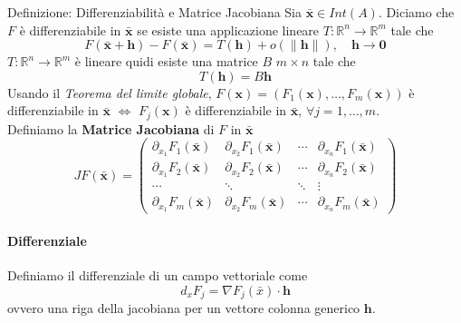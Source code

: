 \documentclass[x11names]{article}
\begin{document}
	\begin{center}
		\colorbox{myblue}{\begin{minipage}{5.75in}
				\begin{blues}{Definizione: Differenziabilità e Matrice Jacobiana}
					Sia \(\boldsymbol{\bar{x}} \in Int(A)\). Diciamo che \(F\) è differenziabile in \(\boldsymbol{\bar{x}}\) se esiste una applicazione lineare \(T:\mathbb{R}^n\to \mathbb{R}^m\) tale che
					\[ 
					F(\boldsymbol{\bar{x}} + \boldsymbol{h}) - F(\boldsymbol{\bar{x}}) = T(\boldsymbol{h}) + o(\|\boldsymbol{h}\|), \quad \boldsymbol{h} \to \boldsymbol{0}
					\]
					\(T:\mathbb{R}^n\to \mathbb{R}^m\) è lineare quidi esiste una matrice \(B\) \(m\times n\) tale che
					\[ 
					T(\boldsymbol{h}) = B\boldsymbol{h}
					\] 
					Usando il \textit{Teorema del limite globale}, \(F(\boldsymbol{x}) = (F_{1}(\boldsymbol{x}),\dots,F_{m}(\boldsymbol{x}))\) è differenziabile in \(\boldsymbol{\bar{x}}\) \(\Longleftrightarrow\) \(F_{j}(\boldsymbol{x})\) è differenziabile in \(\boldsymbol{\bar{x}}\), \(\forall j = 1,\dots,m\). \\
					
					Definiamo la \textbf{Matrice Jacobiana} di \(F\) in \(\boldsymbol{\bar{x}}\)
					\[ 
					JF(\boldsymbol{\bar{x}}) = 
					\left(\begin{array}{cccc}
						\partial_{x_{1}}F_{1}(\boldsymbol{\bar{x}}) & \partial_{x_{2}}F_{1}(\boldsymbol{\bar{x}}) & \cdots & \partial_{x_{n}}F_{1}(\boldsymbol{\bar{x}})  \\
						\partial_{x_{1}}F_{2}(\boldsymbol{\bar{x}}) & \partial_{x_{2}}F_{2}(\boldsymbol{\bar{x}}) & \cdots & \partial_{x_{n}}F_{2}(\boldsymbol{\bar{x}})  \\
						\cdots & \ddots & \ddots & \vdots \\
						\partial_{x_{1}}F_{m}(\boldsymbol{\bar{x}}) & \partial_{x_{2}}F_{m}(\boldsymbol{\bar{x}}) & \cdots & \partial_{x_{n}}F_{m}(\boldsymbol{\bar{x}})   
					\end{array}\right)
					\]
				\end{blues}
		\end{minipage}}      
	\end{center}
	
	\paragraph{Differenziale}
	Definiamo il differenziale di un campo vettoriale come
	\[ 
	d_{x}F_{j} = \nabla F_{j}(\bar{x}) \cdot \boldsymbol{h}
	\]
	ovvero una riga della jacobiana per un vettore colonna generico \(\boldsymbol{h}\).
	
\end{document}
